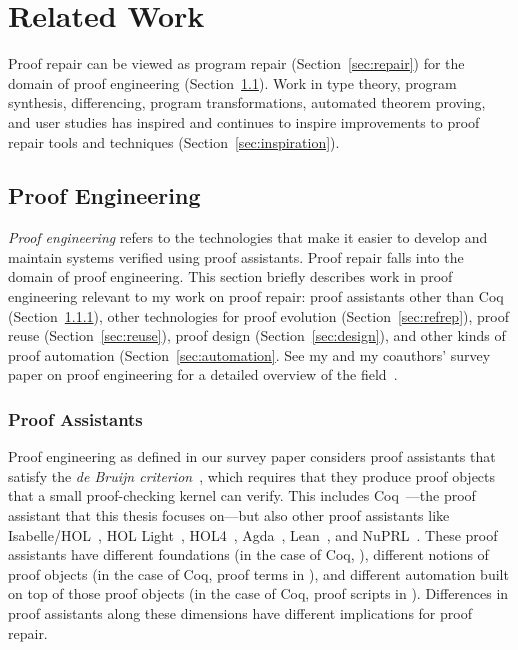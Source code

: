 \chapter{Related Work}
\label{sec:related}


Proof repair can be viewed as program repair (Section~\ref{sec:repair})
for the domain of proof engineering (Section~\ref{sec:proofeng}).
Work in type theory, program synthesis, differencing, program transformations, automated theorem proving, and user studies
has inspired and continues to inspire improvements to proof repair tools and techniques (Section~\ref{sec:inspiration}).

\section{Proof Engineering}
\label{sec:proofeng}

\textit{Proof engineering} refers to the technologies that make it easier to develop and maintain
systems verified using proof assistants.
Proof repair falls into the domain of proof engineering.
This section briefly describes work in proof engineering relevant to my work on proof repair:
proof assistants other than Coq (Section~\ref{sec:ass}),
other technologies for proof evolution (Section~\ref{sec:refrep}),
proof reuse (Section~\ref{sec:reuse}),
proof design (Section~\ref{sec:design}),
and other kinds of proof automation (Section~\ref{sec:automation}.
See my and my coauthors' survey paper on proof engineering for a detailed overview of the field~\cite{PGL-045}. %

\subsection{Proof Assistants}
\label{sec:ass}

Proof engineering as defined in our survey paper considers proof assistants that satisfy the \textit{de Bruijn criterion}~\cite{Barendregt2002,Barendregt2351}, which requires that they produce proof objects that a small proof-checking kernel can verify.
This includes Coq~\cite{coq}---the proof assistant that this thesis focuses on---but also other proof assistants like
Isabelle/HOL~\cite{isabelle}, HOL Light~\cite{hollight}, HOL4~\cite{hol4-interact}, Agda~\cite{agda}, Lean~\cite{lean}, and NuPRL~\cite{nuprl}.
These proof assistants have different foundations (in the case of Coq, ),
different notions of proof objects (in the case of Coq, proof terms in ),
and different automation built on top of those proof objects (in the case of Coq, proof scripts in ).
Differences in proof assistants along these dimensions have different implications for proof repair.

